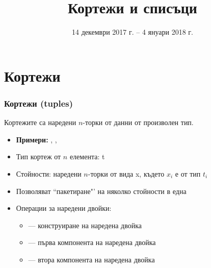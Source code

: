 \documentclass{beamer}
\title{Кортежи и списъци}
\date[14.12.2017--4.01.2018]{14 декември 2017 г. -- 4 януари 2018 г.}
\begin{document}
\begin{frame}
  \titlepage
\end{frame}
\section{Кортежи}

\begin{frame}
  \frametitle{Кортежи (tuples)}

  Кортежите са наредени $n$-торки от данни от произволен тип.
  \begin{itemize}[<+->]
  \item \textbf{Примери:} , , 
  \item Тип кортеж от $n$ елемента: \tuple t
  \item Стойности: наредени $n$-торки от вида \tuple x, където $x_i$ е от тип $t_i$
  \item Позволяват ``пакетиране"' на няколко стойности в една
  \item Операции за наредени двойки:
    \begin{itemize}
    \item {} --- конструиране на наредена двойка
    \item {} --- първа компонента на наредена двойка
    \item {} --- втора компонента на наредена двойка
    \end{itemize}
  \end{itemize}
\end{frame}
\end{document}
